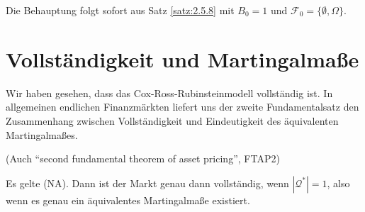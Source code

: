\documentclass[a4paper,twoside,DIV15,BCOR12mm]{scrbook}
\newcommand{\cF}{\mathcal F}
\newcommand{\cQ}{\mathcal Q}
\begin{document}
\begin{beweis}
Die Behauptung folgt sofort aus Satz \ref{satz:2.5.8} mit $B_0=1$ und $\cF_0=\{\emptyset, \Omega\}$.
\end{beweis}

\section{Vollständigkeit und Martingalmaße}

Wir haben gesehen, dass das Cox-Ross-Rubinsteinmodell vollständig ist. In allgemeinen endlichen Finanzmärkten liefert uns der zweite Fundamentalsatz den Zusammenhang zwischen Vollständigkeit und Eindeutigkeit des äquivalenten Martingalmaßes.

\begin{satz}
(Auch “second fundamental theorem of asset pricing”, FTAP2)\label{satz:2.6.1}

Es gelte (NA). Dann ist der Markt genau dann vollständig, wenn $|\cQ^*|=1$, also wenn es genau ein äquivalentes Martingalmaße existiert.
\end{satz}
\end{document}
